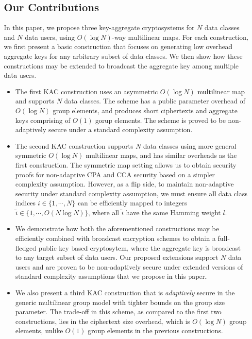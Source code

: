 \subsection{Our Contributions}
\label{subsec:contributions}

In this paper, we propose three key-aggregate cryptosystems for $N$ data classes and $N$ data users, using $O(\log N)$-way multilinear maps. For each construction, we first present a basic construction that focuses on generating low overhead aggregate keys for any arbitrary subset of data classes. We then show how these constructions may be extended to broadcast the aggregate key among multiple data users. 

\let\labelitemi\labelitemii

\begin{itemize}
 \item The first KAC construction uses an asymmetric $O(\log N)$ multilinear map and supports $N$ data classes. The scheme has a public parameter overhead of $O(\log N)$ group elements, and produces short ciphertexts and aggregate keys comprising of $O(1)$ gorup elements. The scheme is proved to be non-adaptively secure under a standard complexity assumption.\\
 
 \item The second KAC construction supports $N$ data classes using more general symmetric $O(\log N)$ multilinear maps, and has similar overheads as the first construction. The symmetric map setting allows us to obtain security proofs for non-adaptive CPA and CCA security based on a simpler complexity assumption. However, as a flip side, to maintain non-adaptive security under standard complexity assumption, we must ensure all data class indices $i \in \{1,\cdots,N\}$ can be efficiently mapped to integers $\hat{i} \in \{1,\cdots,O(N\log N)\}$, where all $\hat{i}$ have the same Hamming weight $l$.\\
 
 \item We demonstrate how both the aforementioned constructions may be efficiently combined with broadcast encryption schemes \cite{boneh2005collusion,boneh2014low} to obtain a full-fledged public key based cryptosytem, where the aggregate key is broadcast to any target subset of data users. Our proposed extensions support $N$ data users and are proven to be non-adaptively secure under extended versions of standard complexity assumptions that we propose in this paper.\\
 
 \item We also present a third KAC construction that is \emph{adaptively} secure in the generic multilinear group model with tighter bounds on the group size parameter. The trade-off in this scheme, as compared to the first two constructions, lies in the ciphertext size overhead, which is $O(\log N)$ group elements, unlike $O(1)$ group elements in the previous constructions.
 

\end{itemize}

